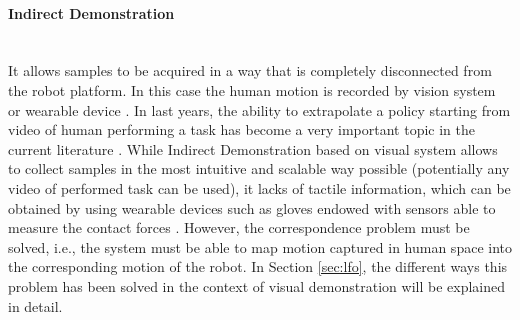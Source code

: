 \paragraph{Indirect Demonstration}  \mbox{} \\ 
It allows samples to be acquired in a way that is completely disconnected from the robot platform. In this case the human motion is recorded by vision system \cite{smith2019avid,sermanet2018time_contrastive} or wearable device \cite{liu2019_mirroring_without_overimitation}. In last years, the ability to extrapolate a policy starting from video of human performing a task has become a very important topic in the current literature \cite{fang2019survey,torabi2019recent_advances_lfo}. While Indirect Demonstration based on visual system allows to collect samples in the most intuitive and scalable way possible (potentially any video of performed task can be used), it lacks of tactile information, which can be obtained by using wearable devices such as gloves endowed with sensors able to measure the contact forces \cite{liu2017glove_force}. However, the correspondence problem must be solved, i.e., the system must be able to map motion captured in human space into the corresponding motion of the robot. In Section \ref{sec:lfo}, the different ways this problem has been solved in the context of visual demonstration will be explained in detail.
